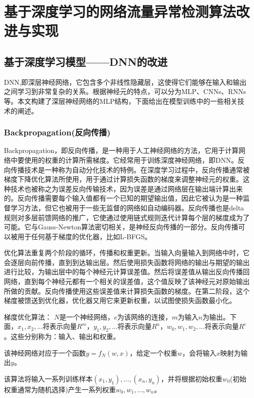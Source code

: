 
\chapter{基于深度学习的网络流量异常检测算法改进与实现}

\section{基于深度学习模型——DNN的改进}
DNN,即深层神经网络，它包含多个非线性隐藏层，这使得它们能够在输入和输出之间学习到非常复杂的关系。根据神经元的特点，可以分为MLP、CNNs、RNNs等。本文构建了深层神经网络的MLP结构，下面给出在模型训练中的一些相关技术的阐述。

\subsection{Backpropagation(反向传播)}

Backpropagation，即反向传播，是一种用于人工神经网络的方法，它用于计算网络中要使用的权重的计算所需梯度。它经常用于训练深度神经网络，即DNN。反向传播技术是一种称为自动分化技术的特例。在深度学习过程中，反向传播通常被梯度下降优化算法所使用，用于通过计算损失函数的梯度来调整神经元的权重。这种技术也被称之为误差反向传输技术，因为误差是通过网络层在输出端计算出来的。反向传播需要每个输入值都有一个已知的期望输出值，因此它被认为是一种监督学习方法，但它也被用于一些无监督的网络如自动编码器。反向传播也是delta规则对多层前馈网络的推广，它使通过使用链式规则迭代计算每个层的梯度成为了可能。它与Gauss-Newton算法密切相关，是神经反向传播的一部分。反向传播可以被用于任何基于梯度的优化器，比如L-BFGS。

优化算法重复两个阶段的循环，传播和权重更新。当输入向量输入到网络中时，它会逐层向前传播，直到到达输出层。然后使用损失函数将网络的输出与期望的输出进行比较，为输出层中的每个神经元计算误差值。然后将误差值从输出反向传播回网络，直到每个神经元都有一个相关的误差值，这个值反映了该神经元对原始输出所做的贡献。反向传播使用这些误差值来计算损失函数的梯度。在第二阶段，这个梯度被馈送到优化器，优化器又用它来更新权重，以试图使损失函数最小化。

梯度优化算法：
$N$是一个神经网络，$e$为该网络的连接，$m$为输入$n$为输出。下面，$x_1,x_2,...$将表示向量$R^m$，$y_1,y_2,...$将表示向量$R^n$，$w_0,w_1,w_2,...$将表示向量$R^e$。这些分别称为：输入、输出和权重。

该神经网络对应于一个函数$y = f_N(w,x)$，给定一个权重$w$，会将输入$x$映射为输出$y$。

该算法将输入一系列训练样本$(x_1,y_1),...,(x_n,y_n)$，并将根据初始权重$w_0$(初始权重通常为随机选择)产生一系列权重$w_0,w_1,...,w_n$。

